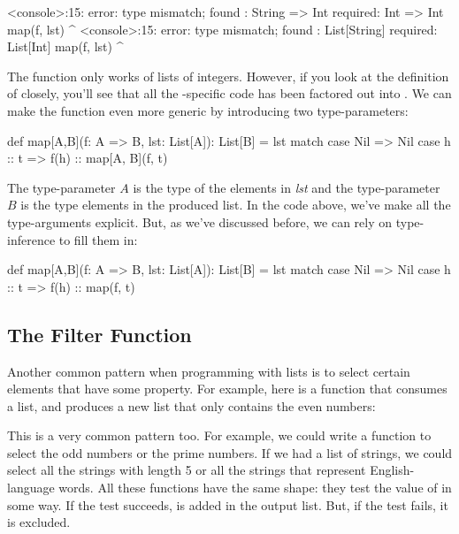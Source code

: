 \documentclass{book}
\begin{document}
\begin{console}
<console>:15: error: type mismatch;
 found   : String => Int
 required: Int => Int
         map(f, lst)
             ^
<console>:15: error: type mismatch;
 found   : List[String]
 required: List[Int]
         map(f, lst)
                  ^
\end{console}

The  function only works of lists of integers. However, if you
look at the definition of  closely, you'll see that all the
-specific code has been factored out into . We
can make the function even more generic by introducing two type-parameters:

\begin{scalacode}
def map[A,B](f: A => B, lst: List[A]): List[B] = lst match {
  case Nil => Nil
  case h :: t => f(h) :: map[A, B](f, t)
}
\end{scalacode}

The type-parameter $A$ is the type of the elements in
\emph{lst} and the type-parameter $B$ is the type elements in the produced list.
In the code above, we've make all the type-arguments explicit. But, as we've
discussed before, we can rely on type-inference to fill them in:

\begin{scalacode}
def map[A,B](f: A => B, lst: List[A]): List[B] = lst match {
  case Nil => Nil
  case h :: t => f(h) :: map(f, t)
}
\end{scalacode}

\subsection{The Filter Function}

Another common pattern when programming with lists is to select certain elements
that have some property. For example, here is a function that consumes a list,
and produces a new list that only contains the even numbers:


This is a very common pattern too. For example, we could write a function to
select the odd numbers or the prime numbers. If we had a list of strings, we
could select all the strings with length 5 or all the strings that represent
English-language words. All these functions have the same shape: they test
the value of  in some way. If the test succeeds,  is added in
the output list. But, if the test fails, it is excluded.
\end{document}
